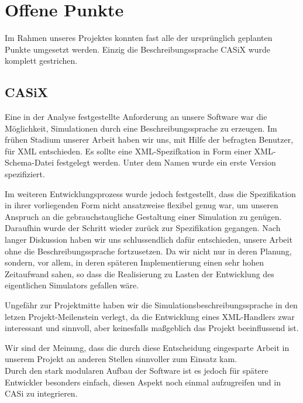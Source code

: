 
\section{Offene Punkte}\label{sec:conc_open_questions}
Im Rahmen unseres Projektes konnten fast alle der ursprünglich geplanten Punkte umgesetzt werden. Einzig die Beschreibungssprache CASiX wurde komplett gestrichen.

\subsection{CASiX}\label{subsec:conc_open_questions_casix}
Eine in der Analyse festgestellte Anforderung an unsere Software war die Möglichkeit, Simulationen durch eine Beschreibungssprache zu erzeugen. Im frühen Stadium unserer Arbeit haben wir uns, mit Hilfe der befragten Benutzer, für XML entschieden. Es sollte eine XML-Spezifkation in Form einer XML-Schema-Datei festgelegt werden. Unter dem Namen  wurde ein erste Version spezifiziert.

Im weiteren Entwicklungsprozess wurde jedoch festgestellt, dass die Spezifikation in ihrer vorliegenden Form nicht ansatzweise flexibel genug war, um unseren Anspruch an die gebrauchstaugliche Gestaltung einer Simulation zu genügen. Daraufhin wurde der Schritt wieder zurück zur Spezifikation gegangen. Nach langer Diskussion haben wir uns schlussendlich dafür entschieden, unsere Arbeit ohne die Beschreibungssprache fortzusetzen. Da wir nicht nur in deren Planung, sondern, vor allem, in deren späteren Implementierung einen sehr hohen Zeitaufwand sahen, so dass die Realisierung zu Lasten der Entwicklung des eigentlichen Simulators gefallen wäre.

Ungefähr zur Projektmitte haben wir die Simulations\-beschreibungs\-sprache in den letzen Projekt-Meilenstein verlegt, da die Entwicklung eines XML-Handlers zwar interessant und sinnvoll, aber keinesfalls maßgeblich das Projekt beeinflussend ist. 

Wir sind der Meinung, dass die durch diese Entscheidung eingesparte Arbeit in unserem Projekt an anderen Stellen sinnvoller zum Einsatz kam.\\

Durch den stark modularen Aufbau der Software ist es jedoch für spätere Entwickler besonders einfach, diesen Aspekt noch einmal aufzugreifen und in CASi zu integrieren.

